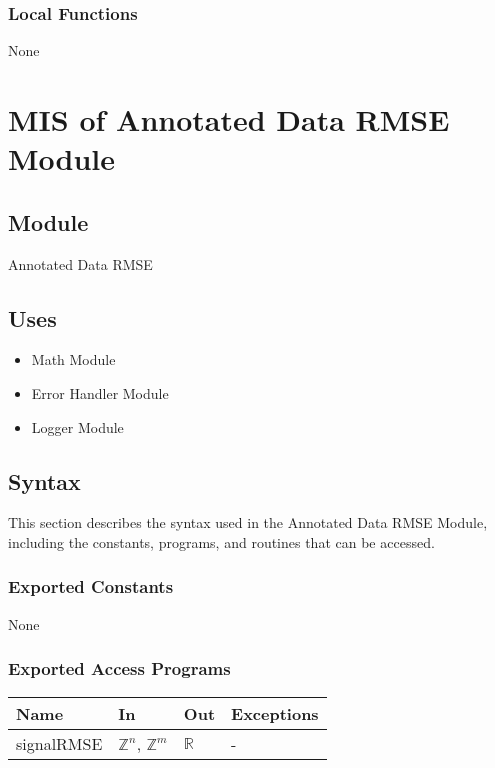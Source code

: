 \documentclass[12pt, titlepage]{article}
\begin{document}
\subsubsection{Local Functions}

None

\newpage

\section{MIS of Annotated Data RMSE Module} \label{MIS_RMSE}

\subsection{Module}

Annotated Data RMSE

\subsection{Uses}

\begin{itemize}
\item Math Module
\item Error Handler Module
\item Logger Module
\end{itemize}

\subsection{Syntax}

This section describes the syntax used in the Annotated Data RMSE Module,
including the constants, programs, and routines that can be accessed.

\subsubsection{Exported Constants}

None

\subsubsection{Exported Access Programs}

\begin{center}
\begin{tabular}{p{2cm} p{4cm} p{4cm} p{2cm}}
\hline
\textbf{Name} & \textbf{In} & \textbf{Out} & \textbf{Exceptions} \\
\hline
signalRMSE & $\mathbb{Z}^n$, $\mathbb{Z}^m$ & $\mathbb{R}$ & - \\
\hline
\end{tabular}
\end{center}
\end{document}
